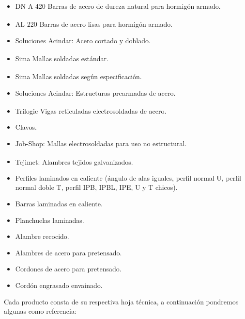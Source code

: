 \documentclass[12pt,a4paper]{article}
\begin{document}
\begin{itemize}
    \item DN A 420\textsuperscript{\textregistered} Barras de acero de dureza natural para hormigón armado.
    \item AL 220\textsuperscript{\textregistered} Barras de acero lisas para hormigón armado.
    \item Soluciones Acindar: Acero cortado y doblado.
    \item Sima\textsuperscript{\textregistered} Mallas soldadas estándar.
    \item Sima\textsuperscript{\textregistered} Mallas soldadas según especificación.
    \item Soluciones Acindar: Estructuras prearmadas de acero.
    \item Trilogic\textsuperscript{\textregistered} Vigas reticuladas electrosoldadas de acero.
    \item Clavos.
    \item Job-Shop: Mallas electrosoldadas para uso no estructural.
    \item Tejimet\textsuperscript{\textregistered}: Alambres tejidos galvanizados.
    \item Perfiles laminados en caliente (ángulo de alas iguales, perfil normal U, perfil normal doble T, perfil IPB, IPBL, IPE, U y T chicos).
    \item Barras laminadas en caliente.
    \item Planchuelas laminadas.
    \item Alambre recocido.
    \item Alambres de acero para pretensado.
    \item Cordones de acero para pretensado.
    \item Cordón engrasado envainado.
\end{itemize}

Cada producto consta de su respectiva hoja técnica, a continuación pondremos algunas como referencia:
\end{document}
